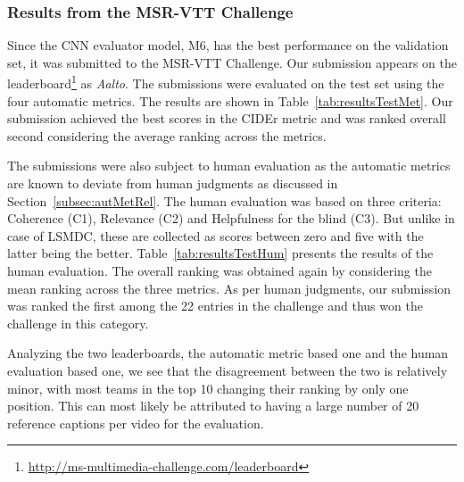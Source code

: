 
\subsubsection{Results from the MSR-VTT Challenge}

Since the CNN evaluator model, M6, has the best performance on the validation
set, it was submitted to the MSR-VTT Challenge.
Our submission appears on the
leaderboard\footnote{\url{http://ms-multimedia-challenge.com/leaderboard}} as
\emph{Aalto}.
The submissions were evaluated on the test set using the four automatic
metrics.
The results are shown in Table~\ref{tab:resultsTestMet}.
Our submission achieved the best scores in the CIDEr metric and was ranked
overall second considering the average ranking across the metrics.

The submissions were also subject to human evaluation as the automatic metrics
are known to deviate from human judgments as discussed in
Section~\ref{subsec:autMetRel}.
The human evaluation was based on three criteria: Coherence (C1), Relevance (C2)
and Helpfulness for the blind (C3).
But unlike in case of LSMDC, these are collected as scores between zero and five
with the latter being the better.
Table~\ref{tab:resultsTestHum} presents the results of the human evaluation.
The overall ranking was obtained again by considering the mean ranking across
the three metrics.
As per human judgments, our submission was ranked the first among the 22 entries
in the challenge and thus won the challenge in this category.

Analyzing the two leaderboards, the automatic metric based one and the human
evaluation based one, we see that the disagreement between the two is relatively
minor, with most teams in the top 10 changing their ranking by only one
position.
This can most likely be attributed to having a large number of 20 reference
captions per video for the evaluation.

